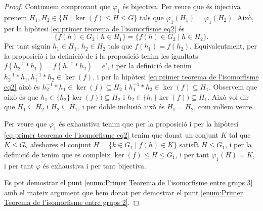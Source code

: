 \documentclass[../../Main.tex]{subfiles}
\begin{document}
\begin{theorem}
\begin{proof}
			Continuem comprovant que \(\varphi_{1}\) és bijectiva. Per veure que és injectiva prenem \(H_{1},H_{2}\in\{H\mid\ker(f)\leq H\leq G\}\) tals que \(\varphi_{1}(H_{1})=\varphi_{1}(H_{2})\). Això, per la hipòtesi \eqref{eq:primer teorema de l'isomorfisme eq2} és
			\[\{f(h)\in G_{2}\mid h\in H_{1}\}=\{f(h)\in G_{2}\mid h\in H_{2}\}.\]
			Per tant siguin \(h_{1}\in H_{1}\), \(h_{2}\in H_{2}\) tals que \(f(h_{1})=f(h_{2})\). Equivalentment, per la proposició  i la definició de  i la proposició  tenim les igualtats \(f(h_{2}^{-1}\ast h_{1})=f(h_{1}^{-1}\ast h_{2})=e'\), i per la definició de  tenim \(h_{2}^{-1}\ast h_{1},h_{1}^{-1}\ast h_{2}\in\ker(f)\), i per la hipòtesi \eqref{eq:primer teorema de l'isomorfisme eq2} això és \(h_{2}^{-1}\ast h_{1}\in\ker(f)\subseteq H_{2}\) i \(h_{1}^{-1}\ast h_{2}\in\ker(f)\subseteq H_{1}\). Observem que això és que \(h_{1}\in\{h_{2}\}\ker(f))\subseteq H_{2}\) i \(h_{2}\in\{h_{1}\}\ker(f))\subseteq H_{1}\). Això vol dir que \(H_{1}\subseteq H_{2}\) i \(H_{2}\subseteq H_{1}\), i per doble inclusió això és \(H_{1}=H_{2}\), com volíem veure. %
			
			Per veure que \(\varphi_{1}\) és exhaustiva tenim que per la proposició  i per la hipòtesi \eqref{eq:primer teorema de l'isomorfisme eq2} tenim que donat un conjunt \(K\) tal que \(K\leq G_{2}\) aleshores el conjunt \(H=\{k\in G_{1}\mid f(h)\in K\}\) satisfà \(H\leq G_{1}\), i per la definició de  tenim que es compleix \(\ker(f)\leq H\leq G_{1}\), i per tant \(\varphi_{1}(H)=K\), i per tant \(\varphi\) és exhaustiva i per tant bijectiva. %
			
			Es pot demostrar el punt \eqref{enum:Primer Teorema de l'isomorfisme entre grups 3} amb el mateix argument que hem donat per demostrar el punt \eqref{enum:Primer Teorema de l'isomorfisme entre grups 2}.
		\end{proof}
	\end{theorem}
\end{document}
